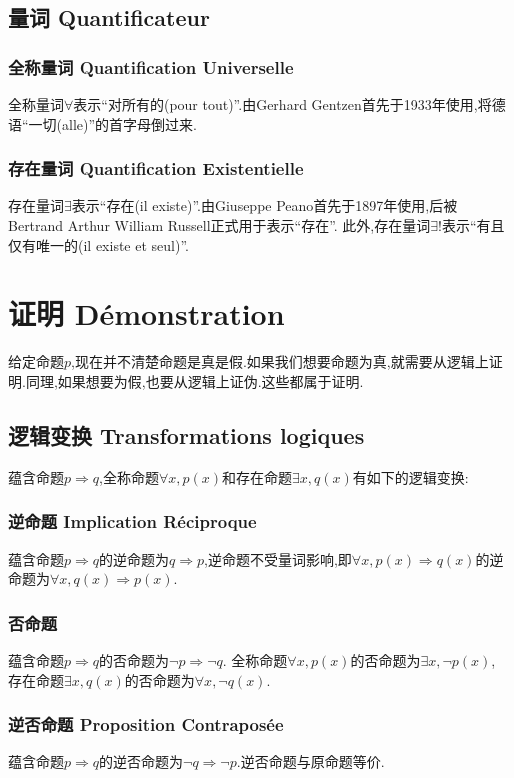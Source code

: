 \documentclass[12pt, a4paper, oneside]{ctexbook}
\begin{document}
  \subsection{量词 Quantificateur}
  \subsubsection{全称量词 Quantification Universelle}
  全称量词$\forall$表示“对所有的(pour tout)”.由Gerhard Gentzen首先于1933年使用,将德语“一切(alle)”的首字母倒过来.

  \subsubsection{存在量词 Quantification Existentielle}
  存在量词$\exists$表示“存在(il existe)”.由Giuseppe Peano首先于1897年使用,后被Bertrand Arthur William Russell正式用于表示“存在”.
  此外,存在量词$\exists !$表示“有且仅有唯一的(il existe et seul)”.

  \section{证明 Démonstration}
  给定命题$p$,现在并不清楚命题是真是假.如果我们想要命题为真,就需要从逻辑上证明.同理,如果想要为假,也要从逻辑上证伪.这些都属于证明.
  \subsection{逻辑变换 Transformations logiques}
  蕴含命题$p\Rightarrow q$,全称命题$\forall x,p(x)$和存在命题$\exists x,q(x)$有如下的逻辑变换:
  \subsubsection{逆命题 Implication Réciproque}
  蕴含命题$p\Rightarrow q$的逆命题为$q\Rightarrow p$,逆命题不受量词影响,即$\forall x,p(x)\Rightarrow q(x)$的逆命题为$\forall x,q(x)\Rightarrow p(x)$.
  \subsubsection{否命题 }
  蕴含命题$p\Rightarrow q$的否命题为$\lnot p\Rightarrow \lnot q$.
  全称命题$\forall x,p(x)$的否命题为$\exists x,\lnot p(x)$,
  存在命题$\exists x,q(x)$的否命题为$\forall x,\lnot q(x)$.
  \subsubsection{逆否命题 Proposition Contraposée}
  蕴含命题$p\Rightarrow q$的逆否命题为$\lnot q\Rightarrow \lnot p$.逆否命题与原命题等价.
\end{document}
